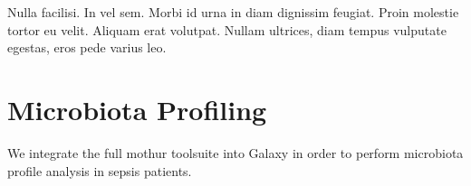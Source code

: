 \begin{savequote}[75mm]
Nulla facilisi. In vel sem. Morbi id urna in diam dignissim feugiat. Proin molestie tortor eu velit. Aliquam erat volutpat. Nullam ultrices, diam tempus vulputate egestas, eros pede varius leo.
\end{savequote}

\chapter{Microbiota Profiling}
\label{chapter:microbiota}
\setcounter{figure}{-1}
\setcounter{table}{-1}
\setcounter{section}{-1}

We integrate the full mothur toolsuite into Galaxy in order to perform microbiota profile analysis in sepsis patients.
